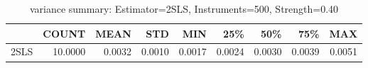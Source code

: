 \begin{table}[ht]
\centering
\caption{variance summary: Estimator=2SLS, Instruments=500, Strength=0.40}
\begin{tabular}{lrrrrrrrr}
\toprule
 & COUNT & MEAN & STD & MIN & 25\% & 50\% & 75\% & MAX \\
\midrule
2SLS & 10.0000 & 0.0032 & 0.0010 & 0.0017 & 0.0024 & 0.0030 & 0.0039 & 0.0051 \\
\bottomrule
\end{tabular}
\end{table}
